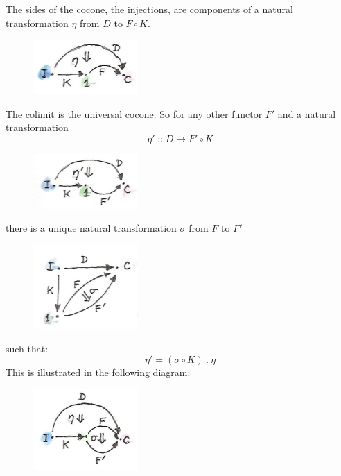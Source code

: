 \noindent
The sides of the cocone, the injections, are components of a natural
transformation $\eta$ from $D$ to $F \circ K$.

\begin{figure}[H]
\centering
\includegraphics[width=40mm]{images/kan10a.jpg}
\end{figure}

\noindent
The colimit is the universal cocone. So for any other functor
$F'$ and a natural transformation
\[\eta' \Colon D \to F' \circ K\]

\begin{figure}[H]
\centering
\includegraphics[width=40mm]{images/kan10b.jpg}
\end{figure}

\noindent
there is a unique natural transformation $\sigma$ from $F$ to $F'$

\begin{figure}[H]
\centering
\includegraphics[width=40mm]{images/kan14.jpg}
\end{figure}

\noindent
such that:
\[\eta' = (\sigma \circ K)\ .\ \eta\]
This is illustrated in the following diagram:

\begin{figure}[H]
\centering
\includegraphics[width=40mm]{images/kan112.jpg}
\end{figure}


